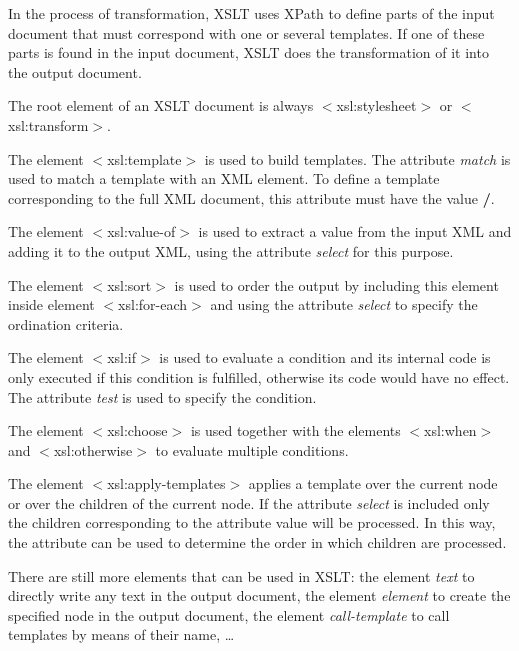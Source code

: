 In the process of transformation, XSLT uses XPath to define parts of the input document that must correspond with one or several templates. If one of these parts is found in the input document, XSLT does the transformation of it into the output document.

The root element of an XSLT document is always $<$xsl:stylesheet$>$ or $<$xsl:transform$>$.

The element $<$xsl:template$>$ is used to build templates. The attribute \textit{match} is used to match a template with an XML element. To define a template corresponding to the full XML document, this attribute must have the value \textbf{/}.

The element $<$xsl:value-of$>$ is used to extract a value from the input XML and adding it to the output XML, using the attribute \textit{select} for this purpose.

The element $<$xsl:sort$>$ is used to order the output by including this element inside element $<$xsl:for-each$>$ and 
using the attribute \textit{select} to specify the ordination criteria.

The element $<$xsl:if$>$ is used to evaluate a condition and its internal code is only executed if this condition is fulfilled, otherwise its code would have no effect. The attribute \textit{test} is used to specify the condition.

The element $<$xsl:choose$>$ is used together with the elements $<$xsl:when$>$ and $<$xsl:otherwise$>$ to evaluate multiple conditions.

The element $<$xsl:apply-templates$>$ applies a template over the current node or over the children of the current node. If the attribute \textit{select} is included only the children corresponding to the attribute value will be processed. In this way, the attribute can be used to determine the order in which children are processed.

There are still more elements that can be used in XSLT: the element \textit{text} to directly write any text in the output document, the element \textit{element} to create the specified node in the output document, the element \textit{call-template} to call templates by means of their name, \ldots